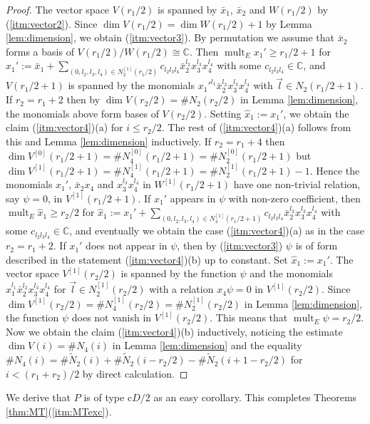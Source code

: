 \documentclass[a4paper,11pt]{amsart}
\theoremstyle{definition}
\theoremstyle{remark}
\numberwithin{equation}{section}
\newcommand{\bC}{{\mathbb C}}
\newcommand{\mult}{\operatorname{mult}}
\begin{document}
\begin{proof}
The vector space $V(r_1/2)$ is spanned by
$\bar{x}_1$, $\bar{x}_2$ and $W(r_1/2)$ by (\ref{itm:vector2}).
Since $\dim V(r_1/2)=\dim W(r_1/2)+1$ by Lemma \ref{lem:dimension},
we obtain (\ref{itm:vector3}).
By permutation we assume that
$\bar{x}_2$ forms a basis of $V(r_1/2)/W(r_1/2)\cong\bC$.
Then $\mult_E x_1' \ge r_1/2+1$ for
$x_1':=\bar{x}_1+\sum_{(0,l_2,l_3,l_4)\in N_{2}^{[1]}(r_1/2)}
c_{l_2l_3l_4}\bar{x}_2^{l_2}x_3^{l_3}x_4^{l_4}$
with some $c_{l_2l_3l_4}\in \bC$,
and $V(r_1/2+1)$ is spanned by the monomials
${x_1'}^{l_1}\bar{x}_2^{l_2}x_3^{l_3}x_4^{l_4}$ with $\vec{l}\in N_2(r_1/2+1)$.
If $r_2=r_1+2$ then
by $\dim V(r_2/2)=\#N_2(r_2/2)$ in Lemma \ref{lem:dimension},
the monomials above form bases of $V(r_2/2)$.
Setting $\hat{x}_1:=x_1'$,
we obtain the claim (\ref{itm:vector4})(a) for $i\le r_2/2$.
The rest of (\ref{itm:vector4})(a) follows
from this and Lemma \ref{lem:dimension} inductively.
If $r_2=r_1+4$ then
$\dim V^{[0]}(r_1/2+1)=\#N_4^{[0]}(r_1/2+1)=\#N_2^{[0]}(r_1/2+1)$ but
$\dim V^{[1]}(r_1/2+1)=\#N_4^{[1]}(r_1/2+1)=\#N_2^{[1]}(r_1/2+1)-1$.
Hence the monomials ${x_1'}$,
$\bar{x}_2x_4$ and $x_3^{l_3}x_4^{l_4}$ in $W^{[1]}(r_1/2+1)$
have one non-trivial relation, say $\psi=0$, in $V^{[1]}(r_1/2+1)$.
If $x_1'$ appears in $\psi$ with non-zero coefficient,
then $\mult_E \hat{x}_1 \ge r_2/2$ for
$\hat{x}_1:=x_1'+\sum_{(0,l_2,l_3,l_4)\in N_{4}^{[1]}(r_1/2+1)}
c_{l_2l_3l_4}\bar{x}_2^{l_2}x_3^{l_3}x_4^{l_4}$
with some $c_{l_2l_3l_4}\in \bC$,
and eventually we obtain the case (\ref{itm:vector4})(a)
as in the case $r_2=r_1+2$.
If $x_1'$ does not appear in $\psi$,
then by (\ref{itm:vector3}) $\psi$ is
of form described in the statement (\ref{itm:vector4})(b) up to constant.
Set $\hat{x}_1:=x_1'$.
The vector space $V^{[1]}(r_2/2)$ is spanned by the function $\psi$ and
the monomials $\hat{x}_1^{l_1}\bar{x}_2^{l_2}x_3^{l_3}x_4^{l_4}$ for
$\vec{l}\in N_2^{[1]}(r_2/2)$
with a relation $x_4\psi=0$ in $V^{[1]}(r_2/2)$.
Since $\dim V^{[1]}(r_2/2)=\#N_4^{[1]}(r_2/2)=\#N_2^{[1]}(r_2/2)$
in Lemma \ref{lem:dimension},
the function $\psi$ does not vanish in $V^{[1]}(r_2/2)$.
This means that $\mult_E \psi=r_2/2$.
Now we obtain the claim (\ref{itm:vector4})(b) inductively,
noticing the estimate $\dim V(i)=\#N_4(i)$ in Lemma \ref{lem:dimension} and
the equality
$\#N_4(i)=\#\tilde{N}_2(i)+\#\tilde{N}_2(i-r_2/2)-\#\tilde{N}_2(i+1-r_2/2)$
for $i<(r_1+r_2)/2$ by direct calculation.
\end{proof}

We derive that $P$ is of type c$D/2$ as an easy corollary.
This completes Theorems \ref{thm:MT}(\ref{itm:MTexc}).
\end{document}
